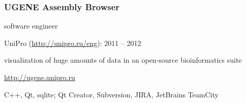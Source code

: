 \documentclass[a4paper, 12pt]{article}
\begin{document}
  \subsubsection*{UGENE Assembly Browser}
  \begin{description}[labelindent=1em]
    \item[Position:] software engineer
    \item[Company:] UniPro (\url{http://unipro.ru/eng}): 2011 -- 2012
    \item[Description:] visualization of huge amounts of data in an open-source bioinformatics suite
    \item[Website:] \url{http://ugene.unipro.ru}
    \item[Technologies and tools:] C++, Qt, sqlite; Qt Creator, Subversion, JIRA, JetBrains TeamCity
  \end{description}
\end{document}
